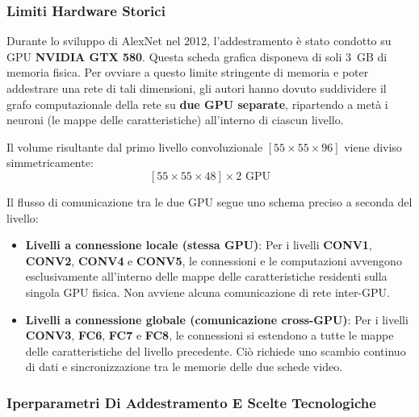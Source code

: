 ﻿\documentclass[11pt, a4paper]{article}
\begin{document}
\subsubsection{Limiti Hardware Storici}

Durante lo sviluppo di AlexNet nel 2012, l'addestramento è stato condotto su GPU \textbf{NVIDIA GTX 580}. Questa scheda grafica disponeva di soli \SI{3}{GB} di memoria fisica. Per ovviare a questo limite stringente di memoria e poter addestrare una rete di tali dimensioni, gli autori hanno dovuto suddividere il grafo computazionale della rete su \textbf{due GPU separate}, ripartendo a metà i neuroni (le mappe delle caratteristiche) all'interno di ciascun livello.


Il volume risultante dal primo livello convoluzionale $[55 \times 55 \times 96]$ viene diviso simmetricamente:
\[
[55 \times 55 \times 48] \times 2 \text{ GPU}
\]

Il flusso di comunicazione tra le due GPU segue uno schema preciso a seconda del livello:
\begin{itemize}
    \item \textbf{Livelli a connessione locale (stessa GPU)}: Per i livelli \textbf{CONV1}, \textbf{CONV2}, \textbf{CONV4} e \textbf{CONV5}, le connessioni e le computazioni avvengono esclusivamente all'interno delle mappe delle caratteristiche residenti sulla singola GPU fisica. Non avviene alcuna comunicazione di rete inter-GPU.
    \item \textbf{Livelli a connessione globale (comunicazione cross-GPU)}: Per i livelli \textbf{CONV3}, \textbf{FC6}, \textbf{FC7} e \textbf{FC8}, le connessioni si estendono a tutte le mappe delle caratteristiche del livello precedente. Ciò richiede uno scambio continuo di dati e sincronizzazione tra le memorie delle due schede video.
\end{itemize}

\subsubsection{Iperparametri Di Addestramento E Scelte Tecnologiche}
\end{document}
